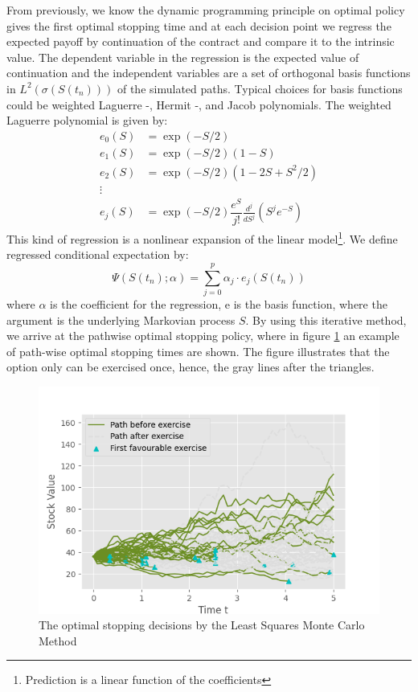 From previously, we know the dynamic programming principle on optimal policy gives the first optimal stopping time and at each decision point we regress the expected payoff by continuation of the contract and compare it to the intrinsic value. The dependent variable in the regression is the expected value of continuation and the independent variables are a set of orthogonal basis functions in $L^2(\sigma(S(t_n)))$ of the simulated paths. Typical choices for basis functions could be weighted Laguerre -, Hermit -, and Jacob polynomials. The weighted Laguerre polynomial is given by:
\begin{align*}
e_0(S) &= \exp(-S/2) \\
e_1(S) &= \exp(-S/2) (1-S) \\
e_2(S) &= \exp(-S/2) (1-2S+S^2/2) \\
\vdots \\
e_j(S) &= \exp(-S/2) \dfrac{e^S}{j!} \frac{d^j}{dS^j}(S^j e^{-S}) 
\end{align*} 
This kind of regression is a nonlinear expansion of the linear model\footnote{Prediction is a linear function of the coefficients}. We define regressed conditional expectation by:
$$\Psi(S(t_n); \alpha)= \sum_{j=0}^p \alpha_j \cdot e_j(S(t_n)) $$
where $\alpha$ is the coefficient for the regression, e is the basis function, where the argument is the underlying Markovian process $S$. By using this iterative method, we arrive at the pathwise optimal stopping policy, where in figure \ref{fig:LSM2} an example of path-wise optimal stopping times are shown. The figure illustrates that the option only can be exercised once, hence, the gray lines after the triangles.\\

\begin{figure}[th]
\centering
\includegraphics{Figures/LSMFit2.png}
\decoRule
\caption[Optimal Stopping Decision]{The optimal stopping decisions by the Least Squares Monte Carlo Method}
\label{fig:LSM2}
\end{figure}

